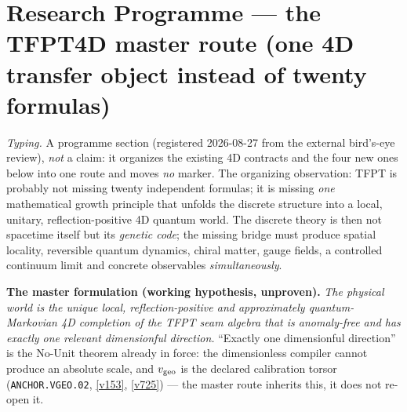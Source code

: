 \documentclass[11pt,a4paper]{article}
\begin{document}
\section*{Research Programme --- the TFPT4D master route (one 4D transfer object instead of twenty formulas)}
\noindent\emph{Typing.} A programme section (registered 2026-08-27 from the external bird's-eye
review), \emph{not} a claim: it organizes the existing 4D contracts and the four new ones below
into one route and moves \emph{no} marker.  The organizing observation: TFPT is probably not
missing twenty independent formulas; it is missing \emph{one} mathematical growth principle that
unfolds the discrete structure into a local, unitary, reflection-positive 4D quantum world.  The
discrete theory is then not spacetime itself but its \emph{genetic code}; the missing bridge
must produce spatial locality, reversible quantum dynamics, chiral matter, gauge fields, a
controlled continuum limit and concrete observables \emph{simultaneously}.

\par\smallskip\noindent\textbf{The master formulation (working hypothesis, unproven).}
\emph{The physical world is the unique local, reflection-positive and approximately
quantum-Markovian 4D completion of the TFPT seam algebra that is anomaly-free and has exactly
one relevant dimensionful direction.}  ``Exactly one dimensionful direction'' is the No-Unit
theorem already in force: the dimensionless compiler cannot produce an absolute scale, and
$v_{\rm geo}$ is the declared calibration torsor (\texttt{ANCHOR.VGEO.02}, \vref{v153},
\vref{v725}) --- the master route inherits this, it does not re-open it.
\end{document}
